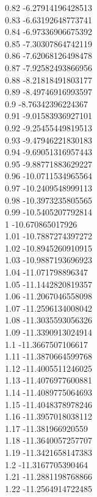 {0.82	-6.27914196428513\\
0.83	-6.63192648773741\\
0.84	-6.97336906675392\\
0.85	-7.30307864742119\\
0.86	-7.62068126498478\\
0.87	-7.92582493866956\\
0.88	-8.21818491803177\\
0.89	-8.49746916993597\\
0.9	-8.76342396224367\\
0.91	-9.01583936927101\\
0.92	-9.25455449819513\\
0.93	-9.47946221830183\\
0.94	-9.69051316957443\\
0.95	-9.88771883629227\\
0.96	-10.0711534965564\\
0.97	-10.2409548999113\\
0.98	-10.3973235805565\\
0.99	-10.5405207792814\\
1	-10.670865017926\\
1.01	-10.7887274397272\\
1.02	-10.8945260910915\\
1.03	-10.9887193696923\\
1.04	-11.071798896347\\
1.05	-11.1442820819357\\
1.06	-11.2067046558098\\
1.07	-11.2596134008042\\
1.08	-11.3035593056326\\
1.09	-11.3390913024914\\
1.1	-11.3667507106617\\
1.11	-11.3870664599768\\
1.12	-11.4005511246025\\
1.13	-11.4076977600881\\
1.14	-11.4089775064693\\
1.15	-11.4048378978246\\
1.16	-11.3957018038112\\
1.17	-11.381966920559\\
1.18	-11.3640057257707\\
1.19	-11.3421658147383\\
1.2	-11.3167705390464\\
1.21	-11.2881198768866\\
1.22	-11.2564914722485\\
}
